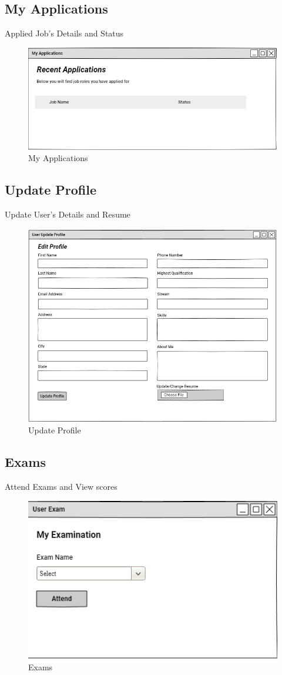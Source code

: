 \documentclass[a4paper,12pt]{report}
\begin{document}
\subsection {My Applications}
Applied Job's Details and Status
\begin{figure}[bph]
	\centering
	\includegraphics[width=.7\linewidth]{img/user/useraplictns}
	\caption{My Applications}
\end{figure}
\pagebreak
\subsection {Update Profile}
Update User's Details and Resume
\begin{figure}[bph]
	\centering
	\includegraphics[width=.7\linewidth ]{img/user/userupdate}
	\caption{Update Profile}
\end{figure}

\subsection {Exams}
Attend Exams and View scores
\begin{figure}[bph]
	\centering
	\includegraphics[width=.4\linewidth]{img/user/userexm}
		\caption{Exams}
\end{figure}
\pagebreak
\end{document}
